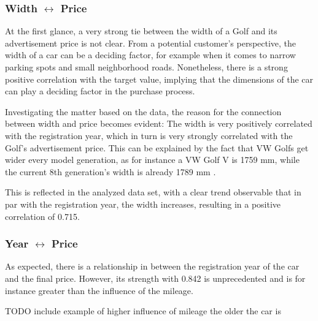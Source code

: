 \subsubsection{Width $\leftrightarrow$ Price}
At the first glance, a very strong tie between the width of a Golf and its advertisement price is not clear.
From a potential customer's perspective, the width of a car can be a deciding factor, for example when it comes to
narrow parking spots and small neighborhood roads.
Nonetheless, there is a strong positive correlation with the target value, implying that the dimensions of the car
can play a deciding factor in the purchase process.
\par
Investigating the matter based on the data, the reason for the connection between width and price becomes evident:
The width is very positively correlated with the registration year, which in turn is very strongly correlated with the Golf's advertisement price.
This can be explained by the fact that VW Golfs get wider every model generation, as for instance a VW Golf V is 1759 mm,
while the current 8th generation's width is already 1789 mm \autocite{VolkswagenGolfTechnical}.
\par
This is reflected in the analyzed data set, with a clear trend observable that in par with the registration year, the width increases,
resulting in a positive correlation of 0.715.

\subsubsection{Year $\leftrightarrow$ Price} \label{year_to_price_correlation}
As expected, there is a relationship in between the registration year of the car and the final price.
However, its strength with 0.842 is unprecedented and is for instance greater than the influence of the mileage. 




TODO include example of higher influence of mileage the older the car is
